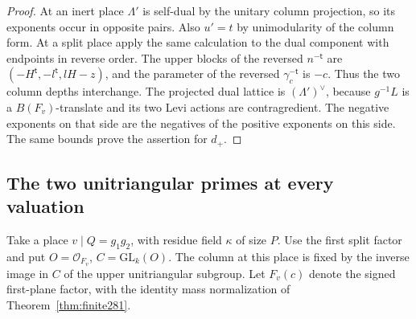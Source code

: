 \documentclass[a4paper,11pt]{article}
\theoremstyle{definition}
\theoremstyle{remark}
\numberwithin{equation}{section}
\begin{document}
\begin{proof}
At an inert place \(\Lambda'\) is self-dual by the unitary
column projection, so its exponents occur in opposite pairs.
Also \(u'=t\) by unimodularity of the column form. At a split
place apply the same calculation to the dual component with
endpoints in reverse order. The upper blocks of the reversed
\(n^{-\mathsf t}\) are \((-H^{\mathsf t},-l^{\mathsf t},lH-z)\),
and the parameter of the reversed \(\gamma_c^{-\mathsf t}\)
is \(-c\). Thus the two column depths interchange. The
projected dual lattice is \((\Lambda')^\vee\), because
\(g^{-1}L\) is a \(B(F_v)\)-translate and its two Levi
actions are contragredient. The negative exponents on that
side are the negatives of the positive exponents on this
side. The same bounds prove the assertion for \(d_+\).
\end{proof}

\subsection{The two unitriangular primes at every valuation}\label{nav:IV-49}
Take a place \(v\mid Q=g_1g_2\), with residue field
\(\kappa\) of size \(P\). Use the first split factor and
put \(O=\mathcal O_{F_v}\), \(C=\mathrm{GL}_k(O)\). The
column at this place is fixed by the inverse image in \(C\)
of the upper unitriangular subgroup. Let \(F_v(c)\) denote
the signed first-plane factor, with the identity mass
normalization of Theorem~\ref{thm:finite281}.
\end{document}
